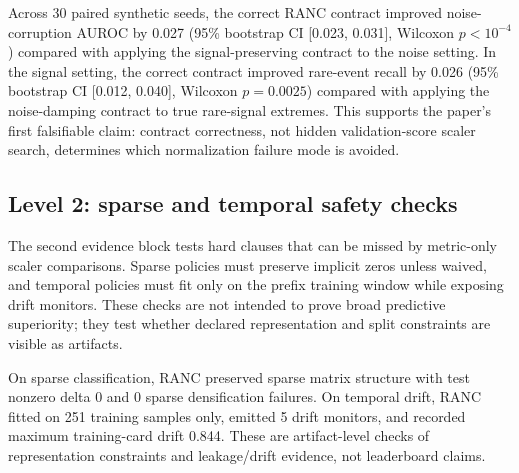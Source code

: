 \documentclass{article}
\begin{document}
Across 30 paired synthetic seeds, the correct RANC contract improved
noise-corruption AUROC by 0.027 (95\% bootstrap CI [0.023, 0.031], Wilcoxon
$p<10^{-4}$) compared with applying the signal-preserving contract to the noise
setting. In the signal setting, the correct contract improved rare-event recall
by 0.026 (95\% bootstrap CI [0.012, 0.040], Wilcoxon $p=0.0025$) compared with
applying the noise-damping contract to true rare-signal extremes. This supports
the paper's first falsifiable claim: contract correctness, not hidden
validation-score scaler search, determines which normalization failure mode is
avoided.

\subsection{Level 2: sparse and temporal safety checks}

The second evidence block tests hard clauses that can be missed by metric-only
scaler comparisons. Sparse policies must preserve implicit zeros unless waived,
and temporal policies must fit only on the prefix training window while exposing
drift monitors. These checks are not intended to prove broad predictive
superiority; they test whether declared representation and split constraints
are visible as artifacts.

\begin{table}[H]
\centering
\small
\caption{Artifact-level safety evidence for hard clauses. The takeaway is that
the audit exposes properties that ordinary score tables often miss: sparse
representation is preserved and temporal fitting uses only the training prefix.
Full sparse and temporal tables are supplementary.}
\label{tab:safety-summary}
\end{table}

On sparse classification, RANC preserved sparse matrix structure with test
nonzero delta 0 and 0 sparse densification failures. On temporal drift, RANC
fitted on 251 training samples only, emitted 5 drift monitors, and recorded
maximum training-card drift 0.844. These are artifact-level checks of
representation constraints and leakage/drift evidence, not leaderboard claims.
\end{document}
